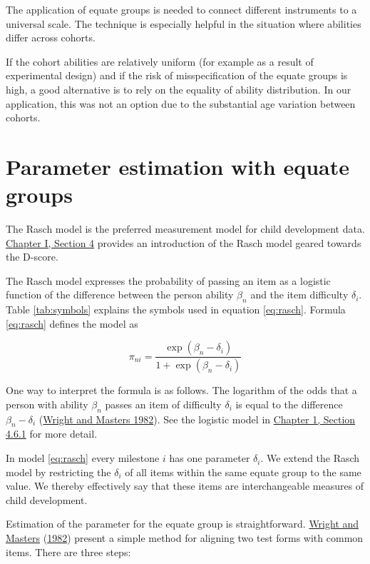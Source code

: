 \documentclass[
]{book}
\begin{document}
The application of equate groups is needed to connect different instruments to a universal scale. The technique is especially helpful in the situation where abilities differ across cohorts.

If the cohort abilities are relatively uniform (for example as a result of experimental design) and if the risk of misspecification of the equate groups is high, a good alternative is to rely on the equality of ability distribution. In our application, this was not an option due to the substantial age variation between cohorts.

\hypertarget{sec:statisticalframe}{%
\section{Parameter estimation with equate groups}\label{sec:statisticalframe}}

The Rasch model is the preferred measurement model for child development data. \href{https://d-score.org/dbook1/ch-newmodel.html}{Chapter I, Section 4} provides an introduction of the Rasch model geared towards the D-score.

The Rasch model expresses the probability of passing an item as a logistic function of the difference between the person ability \(\beta_n\) and the item difficulty \(\delta_i\). Table \ref{tab:symbols} explains the symbols used in equation \eqref{eq:rasch}. Formula \eqref{eq:rasch} defines the model as

\begin{equation}
\pi_{ni} = \frac{\exp(\beta_n - \delta_i)}{1+\exp(\beta_n -\delta_i)} \label{eq:rasch}
\end{equation}

One way to interpret the formula is as follows. The logarithm of the odds that a person with ability \(\beta_n\) passes an item of difficulty \(\delta_i\) is equal to the difference \(\beta_n-\delta_i\) (\protect\hyperlink{ref-wright1982}{Wright and Masters 1982}). See the logistic model in \href{https://d-score.org/dbook1/sec-itemresponsefunctions.html\#logistic-model}{Chapter 1, Section 4.6.1} for more detail.

In model \eqref{eq:rasch} every milestone \(i\) has one parameter \(\delta_i\). We extend the Rasch model by restricting the \(\delta_i\) of all items within the same equate group to the same value. We thereby effectively say that these items are interchangeable measures of child development.

Estimation of the parameter for the equate group is straightforward. \protect\hyperlink{ref-wright1982}{Wright and Masters} (\protect\hyperlink{ref-wright1982}{1982}) present a simple method for aligning two test forms with common items. There are three steps:
\end{document}
